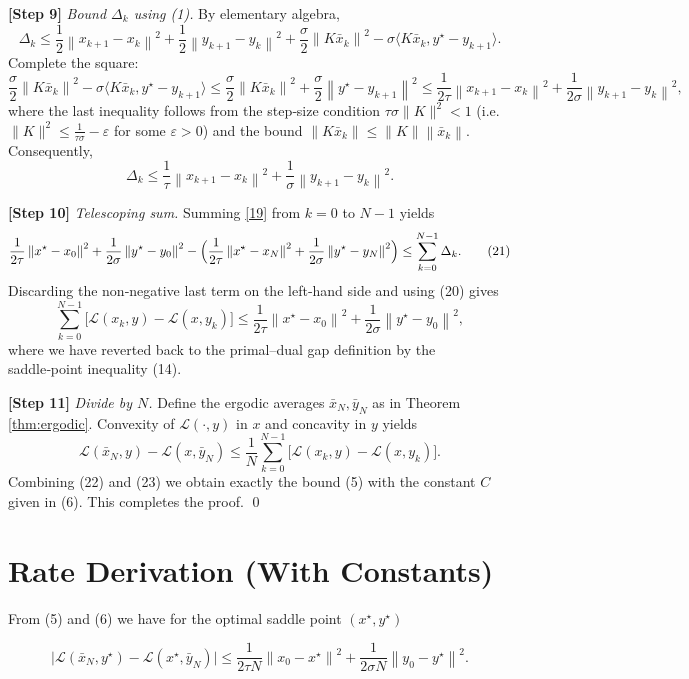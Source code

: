 \documentclass{article}
\newcommand{\inner}[2]{\langle #1,#2\rangle}
\newcommand{\norm}[1]{\left\|#1\right\|}
\begin{document}
\noindent\textbf{[Step 9]} \emph{Bound $\Delta_{k}$ using (1).}  
By elementary algebra,
\[
\Delta_{k}
\le
\frac{1}{2}\norm{x_{k+1}-x_{k}}^{2}
+\frac{1}{2}\norm{y_{k+1}-y_{k}}^{2}
+\frac{\sigma}{2}\norm{K\bar x_{k}}^{2}
-\sigma\inner{K\bar x_{k}}{y^{\star}-y_{k+1}}.
\]
Complete the square:
\[
\frac{\sigma}{2}\norm{K\bar x_{k}}^{2}
-\sigma\inner{K\bar x_{k}}{y^{\star}-y_{k+1}}
\le
\frac{\sigma}{2}\norm{K\bar x_{k}}^{2}
+\frac{\sigma}{2}\norm{y^{\star}-y_{k+1}}^{2}
\le
\frac{1}{2\tau}\norm{x_{k+1}-x_{k}}^{2}
+\frac{1}{2\sigma}\norm{y_{k+1}-y_{k}}^{2},
\]
where the last inequality follows from the step‑size condition
$\tau\sigma\|K\|^{2}<1$ (i.e. $\|K\|^{2}\le\frac{1}{\tau\sigma}-\varepsilon$ for some $\varepsilon>0$) and the bound
$\norm{K\bar x_{k}}\le\|K\|\norm{\bar x_{k}}$.
Consequently,
\[
\Delta_{k}\le
\frac{1}{\tau}\norm{x_{k+1}-x_{k}}^{2}
+\frac{1}{\sigma}\norm{y_{k+1}-y_{k}}^{2}.
\tag{20}
\]

\noindent\textbf{[Step 10]} \emph{Telescoping sum.}  
Summing \eqref{19} from $k=0$ to $N-1$ yields
\[
\frac{1}{2\tau}\norm{x^{\star}-x_{0}}^{2}
+\frac{1}{2\sigma}\norm{y^{\star}-y_{0}}^{2}
-
\Bigl(\frac{1}{2\tau}\norm{x^{\star}-x_{N}}^{2}
+\frac{1}{2\sigma}\norm{y^{\star}-y_{N}}^{2}\Bigr)
\le
\sum_{k=0}^{N-1}\Delta_{k}.
\tag{21}
\]
Discarding the non‑negative last term on the left‑hand side and using (20) gives
\[
\sum_{k=0}^{N-1}\bigl[\mathcal L(x_{k},y)-\mathcal L(x,y_{k})\bigr]
\le
\frac{1}{2\tau}\norm{x^{\star}-x_{0}}^{2}
+\frac{1}{2\sigma}\norm{y^{\star}-y_{0}}^{2},
\tag{22}
\]
where we have reverted back to the primal–dual gap definition by the saddle‑point inequality (14).

\noindent\textbf{[Step 11]} \emph{Divide by $N$.}  
Define the ergodic averages $\bar x_{N},\bar y_{N}$ as in Theorem \ref{thm:ergodic}.  Convexity of $\mathcal L(\cdot,y)$ in $x$ and concavity in $y$ yields
\[
\mathcal L(\bar x_{N},y)-\mathcal L(x,\bar y_{N})
\le
\frac{1}{N}\sum_{k=0}^{N-1}\bigl[\mathcal L(x_{k},y)-\mathcal L(x,y_{k})\bigr].
\tag{23}
\]
Combining (22) and (23) we obtain exactly the bound (5) with the constant $C$ given in (6).  This completes the proof. \qed

\section*{Rate Derivation (With Constants)}
From (5) and (6) we have for the optimal saddle point $(x^{\star},y^{\star})$  

\[
\bigl|\mathcal L(\bar x_{N},y^{\star})-\mathcal L(x^{\star},\bar y_{N})\bigr|
\le
\frac{1}{2\tau N}\norm{x_{0}-x^{\star}}^{2}
+\frac{1}{2\sigma N}\norm{y_{0}-y^{\star}}^{2}.
\tag{24}
\]
\end{document}
